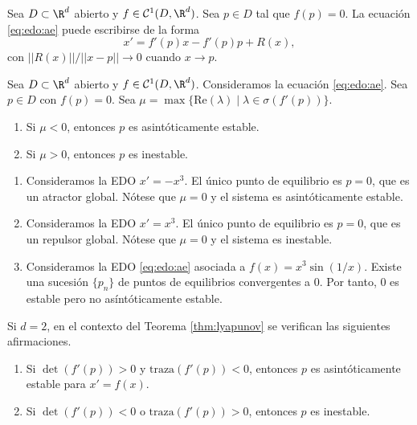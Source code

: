 Sea $D \subset \R^d$ abierto y $f \in \mathcal{C}^1(D, \R^d)$. Sea $p \in D$ tal que $f(p) = 0$. La
ecuación \eqref{eq:edo:ae} puede escribirse de la forma
\begin{equation}
  \label{eq:3}
  x' = f'(p)x - f'(p)p + R(x),
\end{equation}
con $||R(x)|| / ||x-p|| \to 0$ cuando $x\to p$.

\begin{theorem}
  \label{thm:lyapunov}
  Sea $D \subset \R^d$ abierto y $f \in \mathcal{C}^1(D, \R^d)$. Consideramos la ecuación
  \eqref{eq:edo:ae}.  Sea $p \in D$ con $f(p) = 0$. Sea
  $\mu = \max \{\mathrm{Re}(\lambda) \mid \lambda \in \sigma(f'(p))\}$.
  \begin{enumerate}
  \item Si $\mu < 0$, entonces $p$ es asintóticamente estable.
  \item Si $\mu > 0$, entonces $p$ es inestable.
  \end{enumerate}
\end{theorem}

\begin{ex}
  
  \begin{enumerate}
  \item Consideramos la EDO $x' = -x^3$. El único punto de equilibrio es $p = 0$, que es un atractor
    global. Nótese que $\mu = 0$ y el sistema es asintóticamente estable.
  \item Consideramos la EDO $x' = x^3$. El único punto de equilibrio es $p = 0$, que es un repulsor
    global. Nótese que $\mu = 0$ y el sistema es inestable.
  \item Consideramos la EDO \eqref{eq:edo:ae} asociada a $f(x) = x^3 \sin(1/x)$. Existe una sucesión
    $\{p_n\}$ de puntos de equilibrios convergentes a $0$. Por tanto, $0$ es estable pero no
    asíntóticamente estable.
  \end{enumerate}
\end{ex}

\begin{corollary}
  Si $d = 2$, en el contexto del Teorema \ref{thm:lyapunov} se verifican las siguientes
  afirmaciones.
  \begin{enumerate}
  \item Si $\det(f'(p)) > 0$ y $\mathrm{traza}(f'(p)) < 0$, entonces $p$ es asintóticamente estable
    para $x' = f(x)$.
  \item Si $\det(f'(p)) < 0$ o $\mathrm{traza}(f'(p)) > 0$, entonces $p$ es inestable.
  \end{enumerate}
\end{corollary}

